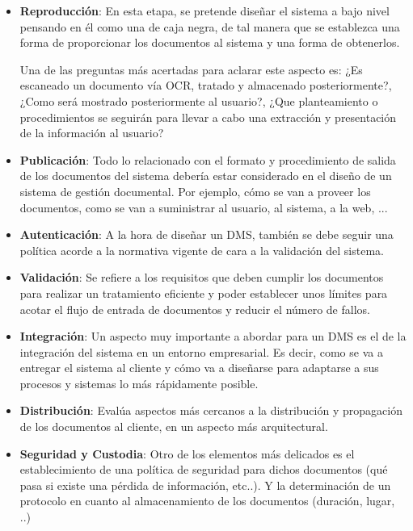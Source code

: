 \documentclass[runningheads,a4paper]{llncs}
\theoremstyle{break}
\begin{document}
\begin{itemize}
  \item \textbf{Reproducción}: En esta etapa, se pretende diseñar el sistema a bajo nivel  pensando en él como una de caja negra, de tal manera que se establezca una forma de proporcionar los documentos al sistema y una forma de obtenerlos. 
  
  Una de las preguntas más acertadas para aclarar este aspecto es: ¿Es escaneado un documento vía OCR, tratado y almacenado posteriormente?, ¿Como será mostrado posteriormente al usuario?, ¿Que planteamiento o procedimientos se seguirán para llevar a cabo una extracción y presentación de la información al usuario?
  
  \item \textbf{Publicación}: Todo lo relacionado con el formato y procedimiento de salida de los documentos del sistema debería estar considerado en el diseño de un sistema de gestión documental. Por ejemplo, cómo se van a proveer los documentos, como se van a suministrar al usuario, al sistema, a la web, ...
  
  \item \textbf{Autenticación}: A la hora de diseñar un DMS, también se debe seguir una política acorde a la normativa vigente de cara a la validación del sistema.

  \item \textbf{Validación}: Se refiere a los requisitos que deben cumplir los documentos para realizar un tratamiento eficiente y poder establecer unos límites para acotar el flujo de entrada de documentos y reducir el número de fallos.

  \item \textbf{Integración}: Un aspecto muy importante a abordar para un DMS es el de la integración del sistema en un entorno empresarial. Es decir, como se va a entregar el sistema al cliente y cómo va a diseñarse para adaptarse a sus procesos y sistemas lo más rápidamente posible.

  \item \textbf{Distribución}: Evalúa aspectos más cercanos a la distribución y propagación de los documentos al cliente, en un aspecto más arquitectural.

  \item \textbf{Seguridad y Custodia}: Otro de los elementos más delicados es el establecimiento de una política de seguridad para dichos documentos (qué pasa si existe una pérdida de información, etc..). Y la determinación de un protocolo en cuanto al almacenamiento de los documentos (duración, lugar, ..)


\end{itemize}
\end{document}
